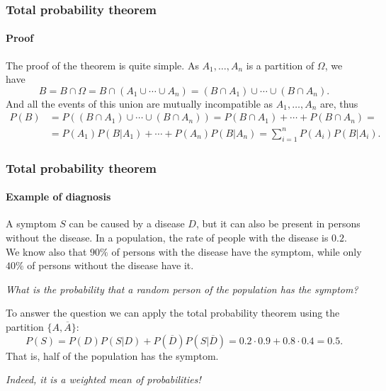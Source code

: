 \begin{frame}
\frametitle{Total probability theorem}
\framesubtitle{Proof}
The proof of the theorem is quite simple.
As $A_1,\ldots,A_n$ is a partition of $\Omega$, we have 
\[
B = B\cap \Omega = B\cap (A_1\cup \cdots \cup A_n) = (B\cap A_1)\cup \cdots \cup (B\cap A_n).
\]
And all the events of this union are mutually incompatible as $A_1,\ldots,A_n$ are, thus
\begin{align*}
P(B) &= P((B\cap A_1)\cup \cdots \cup (B\cap A_n)) = P(B\cap A_1)+\cdots + P(B\cap A_n) =\\
&= P(A_1)P(B|A_1)+\cdots + P(A_n)P(B|A_n) = \sum_{i=1}^n P(A_i)P(B|A_i).
\end{align*}

\begin{center}
\end{center}
\end{frame}


\begin{frame}
\frametitle{Total probability theorem}
\framesubtitle{Example of diagnosis}
A symptom $S$ can be caused by a disease $D$, but it can also be present in persons without the disease.
In a population, the rate of people with the disease is $0.2$. 
We know also that $90\%$ of persons with the disease have the symptom, while only $40\%$ of persons without the
disease have it. 

\emph{What is the probability that a random person of the population has the symptom?}

To answer the question we can apply the total probability theorem using the partition $\{A,\overline A\}$:
\[
P(S) = P(D)P(S|D)+P(\overline D)P(S|\overline D) = 0.2\cdot 0.9 + 0.8\cdot 0.4 = 0.5.
\]
That is, half of the population has the symptom. 

\begin{center}
\emph{Indeed, it is a weighted mean of probabilities!}
\end{center}
\end{frame}



